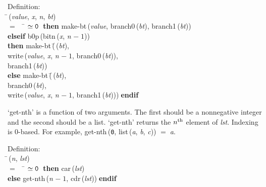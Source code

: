 \begin{tabbing}{\sc Definition}: \\  
\=\,({\it{value\/}}, {\it{x\/}}, {\it{n\/}}, {\it{bt\/}}) \\ 
$=$$\;\;\;\;$\= $\simeq {\tt{0}}$$\;\;${\bf then }{\rm{make-bt}}\,({\it{value\/}}, {\rm{branch0}}\,({\it{bt\/}}), {\rm{branch1}}\,({\it{bt\/}})) \\ 
{\bf elseif }{\rm{b0p}}\,({\rm{bitn}}\,({\it{x\/}}, {\it{n\/}} $-\;1$)) \\ 
{\bf then }{\rm{make-bt}}\,(\=\,({\it{bt\/}}), \\ 
{\rm{write}}\,({\it{value\/}}, {\it{x\/}}, {\it{n\/}} $-\;1$, {\rm{branch0}}\,({\it{bt\/}})), \\ 
{\rm{branch1}}\,({\it{bt\/}}))\- \\ 
{\bf else }{\rm{make-bt}}\,(\=\,({\it{bt\/}}), \\ 
{\rm{branch0}}\,({\it{bt\/}}), \\ 
{\rm{write}}\,({\it{value\/}}, {\it{x\/}}, {\it{n\/}} $-\;1$, {\rm{branch1}}\,({\it{bt\/}})))\-$\;${\bf  endif}\-\-
\end{tabbing}

 `get-nth' is a function of two arguments.  The first should be a
 nonnegative integer and the second should be a list.  `get-nth'
 returns the $n^{\rm{th}}$ element of {\it{lst\/}}.  Indexing is 0-based.
 For example, {\rm{get-nth}}\,({\tt{0}}, {\rm{list}}\,({\it{a\/}}, {\it{b\/}}, {\it{c\/}})) $=$$\;${\it{a\/}}.
\begin{tabbing}{\sc Definition}: \\  
\=\,({\it{n\/}}, {\it{lst\/}}) \\ 
$=$$\;\;\;\;$\= $\simeq {\tt{0}}$$\;\;${\bf then }{\rm{car}}\,({\it{lst\/}}) \\ 
{\bf else }{\rm{get-nth}}\,({\it{n\/}} $-\;1$, {\rm{cdr}}\,({\it{lst\/}}))$\;${\bf  endif}\-\-
\end{tabbing}


